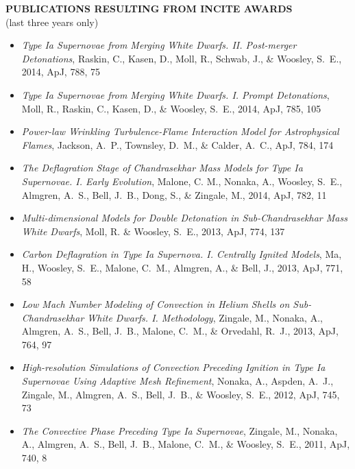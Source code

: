 \documentclass[11pt,letterpaper,english]{article}
\begin{document}
\setlength{\parindent}{0in} %


\pagestyle{fancy} 
 \renewcommand{%
\headrulewidth}{0.0pt}

\begin{center}
{\bf PUBLICATIONS RESULTING FROM INCITE AWARDS} \\
(last three years only)
\end{center}

\begin{itemize}

\item {\em Type Ia Supernovae from Merging White
  Dwarfs. II. Post-merger Detonations}, Raskin, C., Kasen, D., Moll,
  R., Schwab, J., \& Woosley, S.~E., 2014, ApJ, 788, 75

\item {\em Type Ia Supernovae from Merging White Dwarfs. I. Prompt Detonations},
  Moll, R., Raskin, C., Kasen, D., \& Woosley, S.~E., 2014, ApJ, 785, 105

\item {\em Power-law Wrinkling Turbulence-Flame Interaction Model for 
Astrophysical Flames},
  Jackson, A.~P., Townsley, D.~M., \& Calder, A.~C., ApJ, 784, 174 

\item {\em The Deflagration Stage of Chandrasekhar Mass Models for
  Type Ia Supernovae. I. Early Evolution}, Malone, C. M., Nonaka, A.,
  Woosley, S.~E., Almgren, A.~S., Bell, J.~B., Dong, S., \& Zingale, M.,
  2014, ApJ, 782, 11

\item {\em Multi-dimensional Models for Double Detonation in
  Sub-Chandrasekhar Mass White Dwarfs}, Moll, R. \& Woosley, S.~E.,
  2013, ApJ, 774, 137

\item {\em Carbon Deflagration in Type Ia Supernova. I. Centrally
  Ignited Models}, Ma, H., Woosley, S.~E., Malone, C.~M., Almgren, A.,
  \& Bell, J., 2013, ApJ, 771, 58

\item {\em Low Mach Number Modeling of Convection in Helium Shells on
  Sub-Chandrasekhar White Dwarfs. I. Methodology}, Zingale, M.,
  Nonaka, A., Almgren, A.~S., Bell, J.~B., Malone, C.~M., \& Orvedahl,
  R.~J., 2013, ApJ, 764, 97

\item {\em High-resolution Simulations of Convection Preceding
  Ignition in Type Ia Supernovae Using Adaptive Mesh Refinement},
  Nonaka, A., Aspden, A.~J., Zingale, M., Almgren, A.~S., Bell, J.~B., \&
  Woosley, S.~E., 2012, ApJ, 745, 73

\item {\em The Convective Phase Preceding Type Ia Supernovae},
  Zingale, M., Nonaka, A., Almgren, A.~S., Bell, J.~B., Malone, C.~M., \&
  Woosley, S.~E., 2011, ApJ, 740, 8

\end{itemize}
\end{document}
